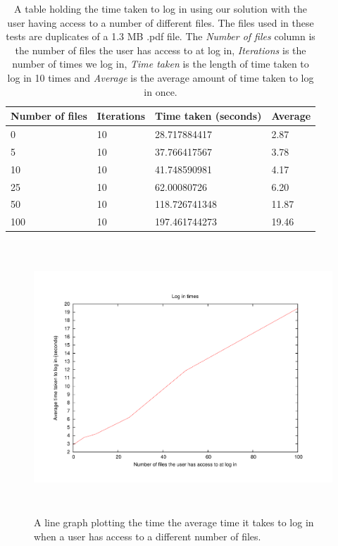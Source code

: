 \documentclass[12pt, titlepage]{article}
\begin{document}
\begin{table}[H]
	\begin{center}
    	\begin{tabular}{ | l | l | l | l |}
    \hline
    \textbf{Number of files} & \textbf{Iterations} & \textbf{Time taken 		(seconds)} & \textbf{Average} \\ \hline
    
    0  & 10 & 28.717884417 & 2.87 \\ \hline
    5  & 10 & 37.766417567 & 3.78 \\ \hline
    10 & 10 & 41.748590981 & 4.17 \\ \hline
    25 & 10 & 62.00080726 & 6.20 \\ \hline
    50 & 10 & 118.726741348 & 11.87 \\ \hline
    100 & 10 & 197.461744273 & 19.46 \\ \hline
    
    \end{tabular}
    \caption{A table holding the time taken to log in using our solution with the user having access to a number of different files. The files used in these tests are duplicates of a 1.3 MB .pdf file. The \textit{Number of files} column is the number of files the user has access to at log in, \textit{Iterations} is the number of times we log in, \textit{Time taken} is the length of time taken to log in 10 times and \textit{Average} is the average amount of time taken to log in once.}
    \label{tab:loginBenchmark}
   \end{center}
\end{table}
    
\begin{figure}[H]
\centerline{\includegraphics[height=4.0in,width=7in,angle=0]{plots/login/loginTimes.pdf}}
\caption{A line graph plotting the time the average time it takes to log in when a user has access to a different number of files.}
\label{fig:loginLineGraph}
\end{figure}
\end{document}
